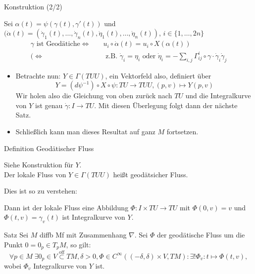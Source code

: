 \documentclass[a6paper,11pt,grid=front]{kartei}
\newcommand{\fl}[1]{\begin{flushleft}
 #1 \end{flushleft}}
\newcounter{def}
\begin{document}
\nonameyet
{Konstruktion } {(2/2)}
{
	\scriptsize
Sei $\alpha(t) = \psi(\gamma(t),\gamma'(t))$  und 
$(\dot \alpha(t) = (\dot \gamma_1(t),\dots,\dot \gamma_n(t), 
\dot \eta_1(t),\dots,\dot \eta_n(t))$, $i \in \{1,\dots,2n\}$
\[
\begin{aligned}
\gamma \text{ ist Geodätiche} 
\Leftrightarrow &
\quad
u_i \circ \dot \alpha (t) = u_i \circ X(\alpha(t)) 
\\ (\Leftrightarrow & 
\quad \text{ z.B. }  \dot \gamma_i = \eta_i 
\text{ oder }
\dot \eta_i = - \sum_{i,j} \Gamma^i_{ij}\circ \gamma\cdot 
\dot \gamma_i \dot \gamma_j   
\end{aligned}
\]
\begin{itemize}[$\mathbf{\cdot}$]
\item Betrachte nun: $Y \in \Gamma(TUU)$, ein Vektorfeld also, definiert über
\[
Y = (d\psi ^{-1})\circ X \circ \psi: TU \to TUU, (p,v) \mapsto Y(p,v)
\]
Wir holen also die Gleichung von oben zurück nach $TU$ und die Integralkurve 
von $Y$ ist genau $\dot \gamma : I \to TU$. Mit diesen Überlegung folgt dann
der nächste Satz.
\item Schließlich kann man dieses Resultat auf ganz $M$ fortsetzen.
\end{itemize}
}
{}
\nonameyet
{Definition} {Geodätischer Fluss}
{
	\small
Siehe Konstruktion für $Y$.\\
Der lokale Fluss von $Y\in\Gamma(TUU)$ heißt geodätsicher Fluss.
\small
\fl{Dies ist so zu verstehen:}
Dann ist der lokale Fluss eine Abbildung
$\Phi: I \times TU \to TU $ mit 
$ \Phi(0,v) = v$ und $\Phi(t,v) = \gamma_v(t)$ ist Integralkurve von $Y$.}
{}

\nonameyet
{Satz} {}
{
Sei $M$ diffb Mf mit Zusammenhang $\nabla$. Sei $\Phi$ der geodätische
Fluss um die Punkt $0 = 0_p \in T_p M$, so gilt:
\scriptsize
\[
\forall p\in M \; \exists 0_p \in V \overset{\text{off}}{\subset} TM,
\delta > 0, \Phi\in C^\infty((-\delta,\delta)\times V,TM)
: \exists! \Phi_v : t\mapsto \Phi(t,v), 
\]
wobei $\Phi_v$ Integralkurve von $Y$ ist.
}
{}
\end{document}
